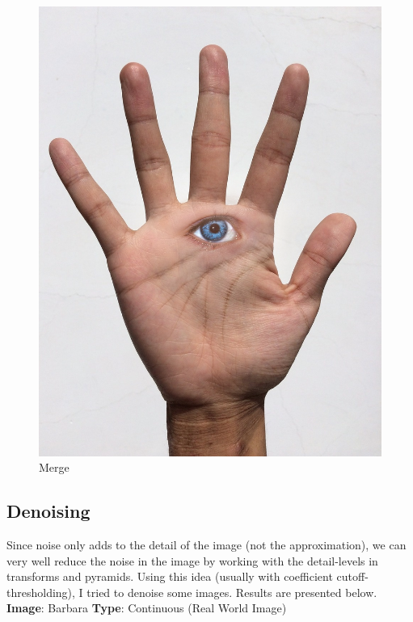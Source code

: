 \documentclass{article}
\begin{document}
\begin{figure}[!htb]
      \includegraphics[scale=.20]{3/.report/blending/et/blend.png}
      \caption{Merge}
    \endminipage \hfill
    \end{figure}
    \pagebreak
    \subsection*{Denoising}
    Since noise only adds to the detail of the image (not the approximation), we can very well reduce the noise in the image by working with the detail-levels in transforms and pyramids. Using this idea (usually with coefficient cutoff-thresholding), I tried to denoise some images. Results are presented below.\\[1pt]
    
    \textbf{Image}: Barbara  \textbf{Type}: Continuous (Real World Image)\\
\end{document}
